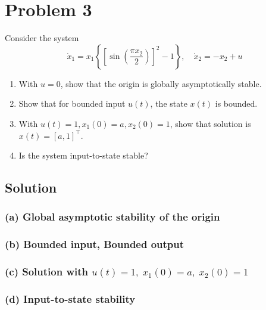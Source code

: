 \section*{Problem 3}

Consider the system
\begin{equation*}
    \dot{x}_{1}=x_{1}\left\{\left[\sin \left(\frac{\pi x_{2}}{2}\right)\right]^{2}-1\right\}, \quad \dot{x}_{2}=-x_{2}+u
\end{equation*}
\begin{enumerate}[label= (\alph*)]
    \item With \( u=0 \), show that the origin is globally asymptotically stable.
    \item Show that for bounded input \( u(t) \), the state \( x(t) \) is bounded.
    \item With \( u(t)=1, x_{1}(0)=a, x_{2}(0)=1 \), show that solution is \( x(t)=[a, 1]^{\top} \).
    \item Is the system input-to-state stable?
\end{enumerate}

\subsection*{Solution}

\subsubsection*{(a) Global asymptotic stability of the origin}

\subsubsection*{(b) Bounded input, Bounded output}

\subsubsection*{(c) Solution with \( u(t)=1, \; x_{1}(0)=a, \; x_{2}(0)=1 \)}

\subsubsection*{(d) Input-to-state stability}
